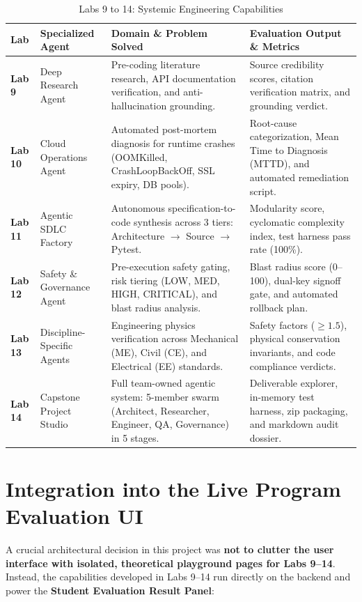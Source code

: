 \documentclass[12pt, a4paper]{report}
\begin{document}
\begin{table}[H]
\centering
\caption{Labs 9 to 14: Systemic Engineering Capabilities}
\renewcommand{\arraystretch}{1.2}
\small
\begin{tabular}{|L{1.5cm}|L{3.5cm}|L{5.2cm}|L{5.3cm}|}
\hline
{}
\color{white}\textbf{Lab} & \color{white}\textbf{Specialized Agent} & \color{white}\textbf{Domain \& Problem Solved} & \color{white}\textbf{Evaluation Output \& Metrics} \\
\hline
\textbf{Lab 9} & Deep Research Agent & Pre-coding literature research, API documentation verification, and anti-hallucination grounding. & Source credibility scores, citation verification matrix, and grounding verdict. \\
\hline
{}
\textbf{Lab 10} & Cloud Operations Agent & Automated post-mortem diagnosis for runtime crashes (OOMKilled, CrashLoopBackOff, SSL expiry, DB pools). & Root-cause categorization, Mean Time to Diagnosis (MTTD), and automated remediation script. \\
\hline
\textbf{Lab 11} & Agentic SDLC Factory & Autonomous specification-to-code synthesis across 3 tiers: Architecture $\rightarrow$ Source $\rightarrow$ Pytest. & Modularity score, cyclomatic complexity index, test harness pass rate (100\%). \\
\hline
{}
\textbf{Lab 12} & Safety \& Governance Agent & Pre-execution safety gating, risk tiering (LOW, MED, HIGH, CRITICAL), and blast radius analysis. & Blast radius score (0--100), dual-key signoff gate, and automated rollback plan. \\
\hline
\textbf{Lab 13} & Discipline-Specific Agents & Engineering physics verification across Mechanical (ME), Civil (CE), and Electrical (EE) standards. & Safety factors ($\ge 1.5$), physical conservation invariants, and code compliance verdicts. \\
\hline
{}
\textbf{Lab 14} & Capstone Project Studio & Full team-owned agentic system: 5-member swarm (Architect, Researcher, Engineer, QA, Governance) in 5 stages. & Deliverable explorer, in-memory test harness, zip packaging, and markdown audit dossier. \\
\hline
\end{tabular}
\end{table}

\section{Integration into the Live Program Evaluation UI}
A crucial architectural decision in this project was \textbf{not to clutter the user interface with isolated, theoretical playground pages for Labs 9--14}. Instead, the capabilities developed in Labs 9--14 run directly on the backend and power the \textbf{Student Evaluation Result Panel}:
\end{document}
